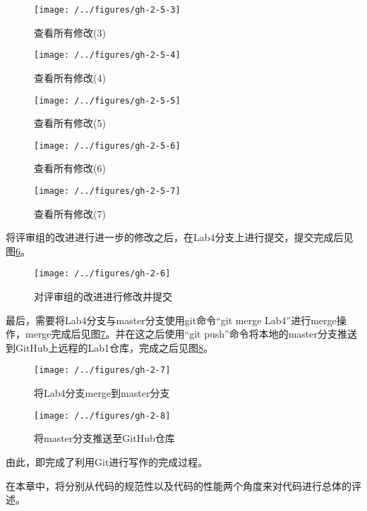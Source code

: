 \begin{figure}
\centering
\texttt{[image: /../figures/gh-2-5-3]}
\caption{查看所有修改(3)}
\label{fig:gh-2-5-3}
\end{figure}

\begin{figure}
\centering
\texttt{[image: /../figures/gh-2-5-4]}
\caption{查看所有修改(4)}
\label{fig:gh-2-5-4}
\end{figure}

\begin{figure}
\centering
\texttt{[image: /../figures/gh-2-5-5]}
\caption{查看所有修改(5)}
\label{fig:gh-2-5-5}
\end{figure}

\begin{figure}
\centering
\texttt{[image: /../figures/gh-2-5-6]}
\caption{查看所有修改(6)}
\label{fig:gh-2-5-6}
\end{figure}

\begin{figure}
\centering
\texttt{[image: /../figures/gh-2-5-7]}
\caption{查看所有修改(7)}
\label{fig:gh-2-5-7}
\end{figure}

将评审组的改进进行进一步的修改之后，在Lab4分支上进行提交，提交完成后见图\ref{fig:gh-2-6}。

\begin{figure}
\centering
\texttt{[image: /../figures/gh-2-6]}
\caption{对评审组的改进进行修改并提交}
\label{fig:gh-2-6}
\end{figure}

最后，需要将Lab4分支与master分支使用git命令“git merge Lab4”进行merge操作，merge完成后见图\ref{fig:gh-2-7}。并在这之后使用“git push”命令将本地的master分支推送到GitHub上远程的Lab1仓库，完成之后见图\ref{fig:gh-2-8}。

\begin{figure}
\centering
\texttt{[image: /../figures/gh-2-7]}
\caption{将Lab4分支merge到master分支}
\label{fig:gh-2-7}
\end{figure}

\begin{figure}
\centering
\texttt{[image: /../figures/gh-2-8]}
\caption{将master分支推送至GitHub仓库}
\label{fig:gh-2-8}
\end{figure}

由此，即完成了利用Git进行写作的完成过程。

在本章中，将分别从代码的规范性以及代码的性能两个角度来对代码进行总体的评述。

